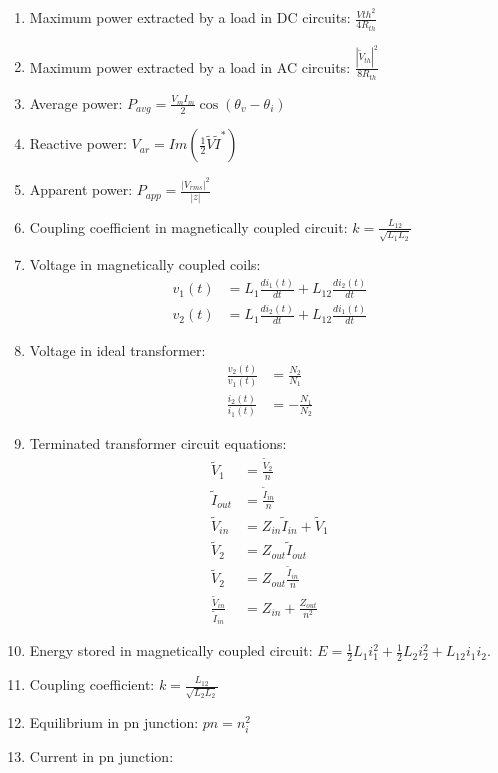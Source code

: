 \documentclass[nobib]{tufte-handout}
\begin{document}
\begin{enumerate}
    \item Maximum power extracted by a load in DC circuits: $\frac{V{th}^2}{4R_{th}}$
    \item Maximum power extracted by a load in AC circuits: $\frac{|\tilde{V}_{th}|^2}{8R_{th}}$
    \item Average power: $P_{avg} = \frac{V_m I_m}{2}\cos{(\theta_v - \theta_i)}$
    \item Reactive power: $V_{ar} = Im(\frac{1}{2}\tilde{V}\tilde{I}^*)$
    \item Apparent power: $P_{app} = \frac{|V_{rms}|^2}{|z|}$
    \item Coupling coefficient in magnetically coupled circuit: $k = \frac{L_{12}}{\sqrt{L_1 L_2}}$
    \item Voltage in magnetically coupled coils: 
    \begin{align*}
        v_{1}(t) &= L_1 \frac{di_1(t)}{dt} + L_{12}\frac{di_2(t)}{dt} \\
        v_{2}(t) &= L_1 \frac{di_2(t)}{dt} + L_{12}\frac{di_1(t)}{dt} 
    \end{align*}
    \item Voltage in ideal transformer: 
    \begin{align*}
        \frac{v_2(t)}{v_1(t)} &= \frac{N_2}{N_1} \\
        \frac{i_2(t)}{i_1(t)} &= -\frac{N_1}{N_2}   
    \end{align*}
    \item Terminated transformer circuit equations: 
    \begin{align*}
        \tilde{V}_1 &= \frac{\tilde{V}_2}{n} \\
        \tilde{I}_{out} &= \frac{\tilde{I}_{in}}{n} \\
        \tilde{V}_{in} &= Z_{in}\tilde{I}_{in} + \tilde{V}_1 \\
        \tilde{V}_2 &= Z_{out}\tilde{I}_{out} \\
        \tilde{V}_2 &= Z_{out}\frac{\tilde{I}_{in}}{n} \\
        \frac{\tilde{V}_{in}}{\tilde{I}_{in}} &= Z_{in} + \frac{Z_{out}}{n^2}
    \end{align*}
    \item Energy stored in magnetically coupled circuit: 
    $E = \frac{1}{2}L_1i_1^2 + \frac{1}{2}L_2i_2^2 + L_{12}i_1i_2$.
    \item Coupling coefficient: $k = \frac{L_{12}}{\sqrt{L_2L_2}}$
    \item Equilibrium in pn junction: $pn = n_i^2$
    \item Current in pn junction: 

\end{enumerate}
\end{document}
